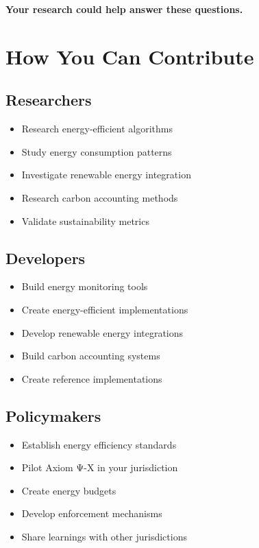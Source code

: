 \textbf{Your research could help answer these questions.}

\vspace{0.5cm}

\section{How You Can Contribute}

\subsection{Researchers}

\begin{itemize}
    \item Research energy-efficient algorithms
    \item Study energy consumption patterns
    \item Investigate renewable energy integration
    \item Research carbon accounting methods
    \item Validate sustainability metrics
\end{itemize}

\subsection{Developers}

\begin{itemize}
    \item Build energy monitoring tools
    \item Create energy-efficient implementations
    \item Develop renewable energy integrations
    \item Build carbon accounting systems
    \item Create reference implementations
\end{itemize}

\subsection{Policymakers}

\begin{itemize}
    \item Establish energy efficiency standards
    \item Pilot Axiom Ψ-X in your jurisdiction
    \item Create energy budgets
    \item Develop enforcement mechanisms
    \item Share learnings with other jurisdictions
\end{itemize}

